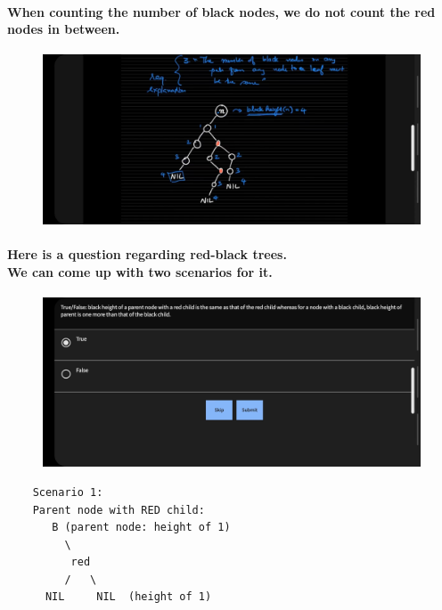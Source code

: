 \documentclass{article}
\begin{document}
\paragraph{
    When counting the number of black nodes, we do not count the red nodes in between.\\
}

\begin{figure}[H]
    \includegraphics[width=\textwidth]{redblacktreeblackheight.jpg}
\end{figure}

\paragraph{
    Here is a question regarding red-black trees.\\
    We can come up with two scenarios for it.\\
}

\begin{figure}[H]
    \includegraphics[width=\textwidth]{redblacktreequestion.jpg}
\end{figure}

\newpage
\begin{verbatim}
    Scenario 1:
    Parent node with RED child:
       B (parent node: height of 1)
         \
          red
         /   \
      NIL     NIL  (height of 1)
\end{verbatim}
\end{document}
